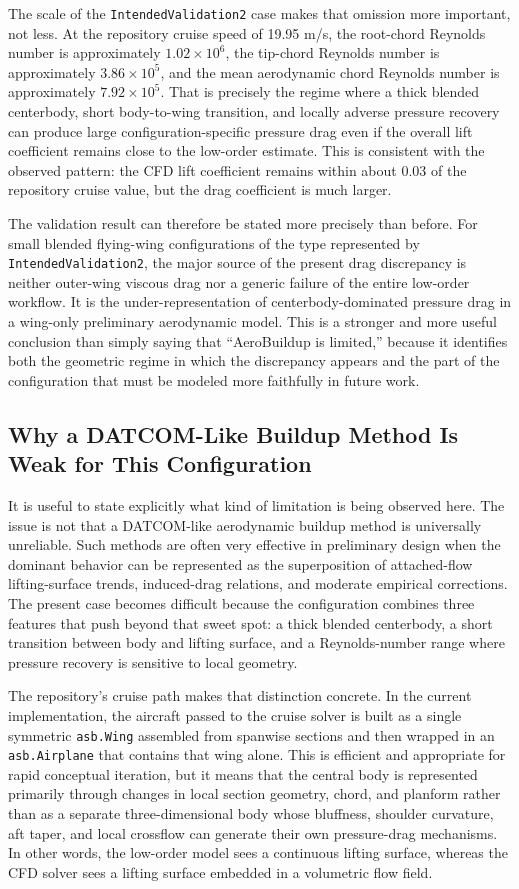 \documentclass[12pt]{report}
\begin{document}
The scale of the \texttt{IntendedValidation2} case makes that omission more important, not less. At the repository cruise speed of 19.95 m/s, the root-chord Reynolds number is approximately \(1.02 \times 10^6\), the tip-chord Reynolds number is approximately \(3.86 \times 10^5\), and the mean aerodynamic chord Reynolds number is approximately \(7.92 \times 10^5\). That is precisely the regime where a thick blended centerbody, short body-to-wing transition, and locally adverse pressure recovery can produce large configuration-specific pressure drag even if the overall lift coefficient remains close to the low-order estimate. This is consistent with the observed pattern: the CFD lift coefficient remains within about 0.03 of the repository cruise value, but the drag coefficient is much larger.

The validation result can therefore be stated more precisely than before. For small blended flying-wing configurations of the type represented by \texttt{IntendedValidation2}, the major source of the present drag discrepancy is neither outer-wing viscous drag nor a generic failure of the entire low-order workflow. It is the under-representation of centerbody-dominated pressure drag in a wing-only preliminary aerodynamic model. This is a stronger and more useful conclusion than simply saying that ``AeroBuildup is limited,'' because it identifies both the geometric regime in which the discrepancy appears and the part of the configuration that must be modeled more faithfully in future work.

\subsection{Why a DATCOM-Like Buildup Method Is Weak for This Configuration}
It is useful to state explicitly what kind of limitation is being observed here. The issue is not that a DATCOM-like aerodynamic buildup method is universally unreliable. Such methods are often very effective in preliminary design when the dominant behavior can be represented as the superposition of attached-flow lifting-surface trends, induced-drag relations, and moderate empirical corrections. The present case becomes difficult because the configuration combines three features that push beyond that sweet spot: a thick blended centerbody, a short transition between body and lifting surface, and a Reynolds-number range where pressure recovery is sensitive to local geometry.

The repository's cruise path makes that distinction concrete. In the current implementation, the aircraft passed to the cruise solver is built as a single symmetric \texttt{asb.Wing} assembled from spanwise sections and then wrapped in an \texttt{asb.Airplane} that contains that wing alone. This is efficient and appropriate for rapid conceptual iteration, but it means that the central body is represented primarily through changes in local section geometry, chord, and planform rather than as a separate three-dimensional body whose bluffness, shoulder curvature, aft taper, and local crossflow can generate their own pressure-drag mechanisms. In other words, the low-order model sees a continuous lifting surface, whereas the CFD solver sees a lifting surface embedded in a volumetric flow field.
\end{document}
